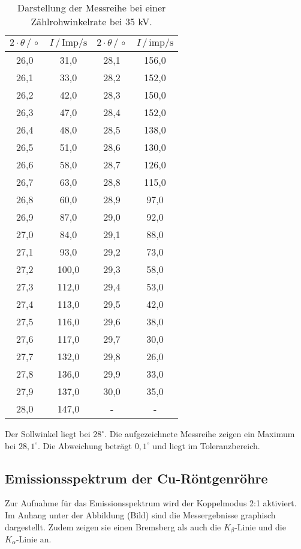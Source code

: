 \begin{table}[H]
  \centering
  \caption{Darstellung der Messreihe bei einer Zählrohwinkelrate bei 35 kV.}
  \label{tab:2}
  \begin{tabular}{c c c c}
  \toprule
  $2\cdot\theta \, / \, \circ$&	$I \, / \, \text{Imp/s}$ &$2\cdot\theta \, / \, \circ$&	$I \, / \, \text{imp/s}$ \\
  \midrule
  26,0&	31,0 &  28,1 &	156,0 \\
  26,1&	33,0 &  28,2 &  152,0 \\
  26,2&	42,0 &  28,3 &  150,0 \\
  26,3&	47,0 &  28,4 &  152,0 \\
  26,4&	48,0 &  28,5 &  138,0 \\
  26,5&	51,0 &  28,6 &  130,0 \\
  26,6&	58,0 &  28,7 &  126,0 \\
  26,7&	63,0 &  28,8 &  115,0 \\
  26,8&	60,0 &  28,9 &   97,0 \\
  26,9&	87,0 &  29,0 &   92,0 \\
  27,0&	84,0 &  29,1 &   88,0 \\
  27,1&	93,0 &  29,2 &   73,0 \\
  27,2&	100,0&  29,3 &   58,0 \\
  27,3&	112,0&  29,4 &   53,0 \\
  27,4&	113,0&  29,5 &   42,0 \\
  27,5&	116,0&  29,6 &   38,0 \\
  27,6&	117,0&  29,7 &   30,0 \\
  27,7&	132,0&  29,8 &   26,0 \\
  27,8&	136,0&  29,9 &   33,0 \\
  27,9&	137,0&  30,0 &   35,0 \\
  28,0&	147,0&    -  &     -  \\
 \bottomrule
\end{tabular}
\end{table}
Der Sollwinkel liegt bei $28^\circ$. Die aufgezeichnete Messreihe zeigen ein Maximum bei $28,1^\circ$.
Die Abweichung beträgt $0,1^\circ$ und liegt im Toleranzbereich.

\subsection{Emissionsspektrum der Cu-Röntgenröhre}
Zur Aufnahme für das Emissionsspektrum wird der Koppelmodus 2:1 aktiviert. Im Anhang unter der Abbildung (Bild)
sind die Messergebnisse graphisch dargestellt. Zudem zeigen sie einen Bremsberg als auch die
$K_\beta \text{-Linie}$ und die $K_\alpha \text{-Linie}$ an.

